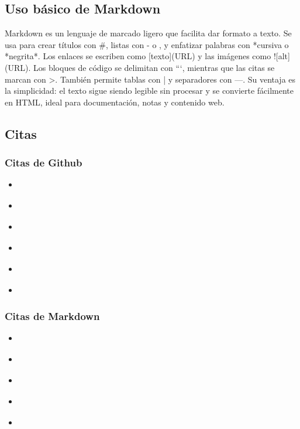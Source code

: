 \documentclass[runningheads]{llncs}
\begin{document}
\subsection{Uso básico de Markdown}

Markdown es un lenguaje de marcado ligero que facilita dar formato a texto. Se usa para crear títulos con \#,
listas con - o , y enfatizar palabras con *cursiva o *negrita*. Los enlaces se escriben como [texto](URL) 
y las imágenes como ![alt](URL). Los bloques de código se delimitan con ```, mientras que las citas se marcan 
con >. También permite tablas con | y separadores con ---. Su ventaja es la simplicidad: el texto sigue siendo 
legible sin procesar y se convierte fácilmente en HTML, ideal para documentación, notas y contenido web.

\subsection{Citas}
\subsubsection{Citas de Github}
\begin{itemize}
    \item \cite{lopez2003latex}
    \item \cite{kalliamvakou2014github}
    \item \cite{dabbish2012social}
    \item \cite{githubdocs2025}
    \item \cite{ray2014github}
    \item \cite{tsay2014github}
\end{itemize}
\subsubsection{Citas de Markdown}
\begin{itemize}
    \item \cite{gruber2004markdown}
    \item \cite{macfarlane2014pandoc}
    \item \cite{perkel2017markdown}
    \item \cite{stackexchange2020markdown}
    \item \cite{markdownguide2025}
\end{itemize}

\end{document}
